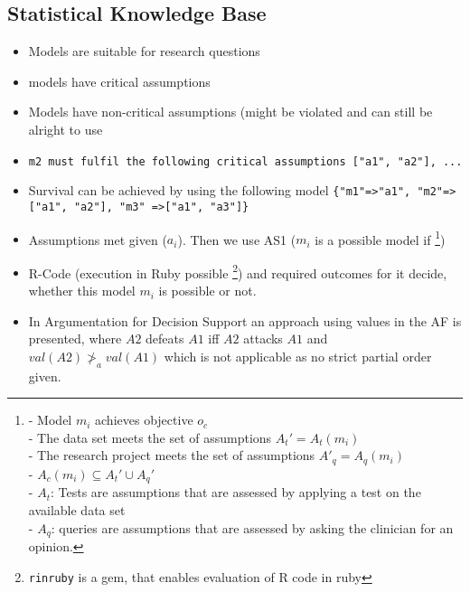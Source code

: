 {\subsection{Statistical Knowledge Base}
\begin{itemize}
	\item Models are suitable for research questions
	\item models have critical assumptions
	\item Models have non-critical assumptions (might be violated and can still be alright to use
	\item \texttt{m2 must fulfil the following critical assumptions ["a1", "a2"], ... }
	\item Survival can be achieved by using the following model \texttt{\{"m1"=>"a1", "m2"=>["a1", "a2"], "m3" =>["a1", "a3"]\}}
	\item Assumptions met given ($a_i$). Then we use AS1 ($m_i$ is a possible model if 
			\footnote{
				- Model $m_i$ achieves objective $o_c$\\
				- The data set meets the set of assumptions $A_t' = A_t (m_i)$\\
				- The research project meets the set of assumptions $A'_q = A_q (m_i)$\\
				- $A_c(m_i) \subseteq A_t' \cup A_q'$\\
				- $A_t$: Tests are assumptions that are assessed by applying a test on the available data set \\
				- $A_q$: queries are assumptions that are assessed by asking the clinician for an opinion.
			})
	\item R-Code (execution in Ruby possible \cite{rinRuby}   \footnote{\texttt{rinruby} is a gem, that enables evaluation of R code in ruby}) and required outcomes for it decide, whether this model $m_i$ is possible or not. 
	\item In Argumentation for Decision Support\cite{Atkinson2006} an approach using values in the AF is presented, where $A2$ defeats $A1$ iff $A2$ attacks $A1$ and $val(A2) \ngtr_a val(A1)$ which is not applicable as no strict partial order given.
\end{itemize}

}